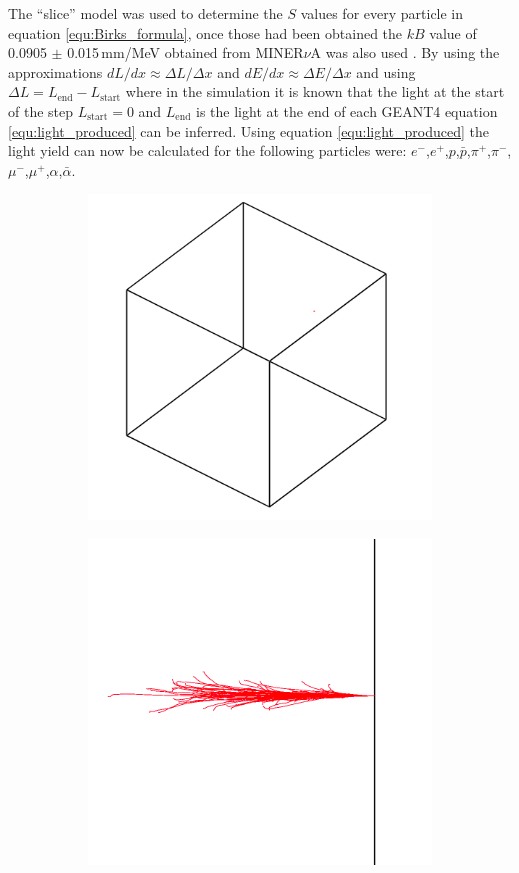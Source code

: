 The ``slice'' model was used to determine the $S$ values for every particle in equation \ref{equ:Birks_formula}, once those had been obtained the $kB$ value of 0.0905 $\pm$ 0.015\,mm/MeV obtained from MINER$\nu$A was also used \cite{aliaga_2015}. By using the approximations $dL/dx \approx \Delta L / \Delta x$ and $dE/dx \approx \Delta E / \Delta x$ and using $\Delta L = L_{\textrm{end}} - L_{\textrm{start}} $ where in the simulation it is known that the light at the start of the step $L_{\textrm{start}} = 0$ and $L_{\textrm{end}}$ is the light at the end of each GEANT4 equation \ref{equ:light_produced} can be inferred. Using equation \ref{equ:light_produced} the light yield can now be calculated for the following particles were: $e^-$,$e^+$,$p$,$\bar{p}$,$\pi^+$,$\pi^-$,$\mu^-$,$\mu^+$,$\alpha$,$\bar{\alpha}$.

\begin{figure}[!h]
\centering
\begin{subfigure}{.5\textwidth}
  \centering
  \includegraphics[width=0.7\linewidth]{Chapter4/Figs/newSlab3d950By900Red.png}
  \captionsetup{width=.9\linewidth}
  \caption{}
  \label{subFig:electronsSlab3d}
\end{subfigure}%
\begin{subfigure}{.5\textwidth}
  \centering
  \includegraphics[width=0.7\linewidth]{Chapter4/Figs/newSlabSideOnView950By900Red.png}

\end{subfigure}
\end{figure}
